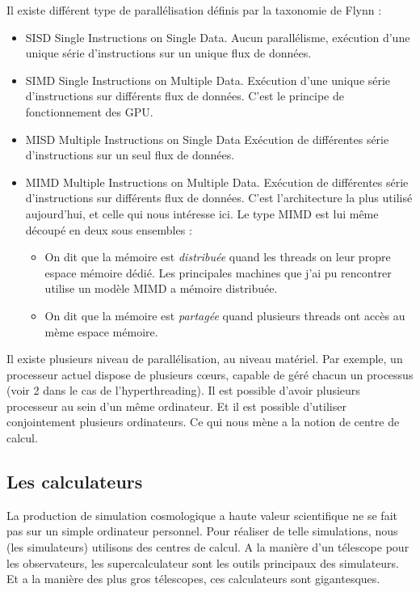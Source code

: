 Il existe différent type de parallélisation définis par la taxonomie de Flynn \citep{Flynn:1972:COE:1952456.1952459}: 

\begin{itemize}
\item SISD Single Instructions on Single Data.
Aucun parallélisme, exécution d'une unique série d'instructions sur un unique flux de données.

\item SIMD Single Instructions on Multiple Data.
Exécution d'une unique série d'instructions sur différents flux de données.
C'est le principe de fonctionnement des GPU.

\item MISD Multiple Instructions on Single Data 
Exécution de différentes série d'instructions sur un seul flux de données.

\item MIMD Multiple Instructions on Multiple Data.
Exécution de différentes série d'instructions sur différents flux de données.
C'est l’architecture la plus utilisé aujourd'hui, et celle qui nous intéresse ici.
Le type MIMD est lui même découpé en deux sous ensembles : 

\begin{itemize}
\item On dit que la mémoire est \textit{distribuée} quand les threads on leur propre espace mémoire dédié.
Les principales machines que j'ai pu rencontrer utilise un modèle MIMD a mémoire distribuée.

\item On dit que la mémoire est \textit{partagée} quand plusieurs threads ont accès au mème espace mémoire.
\end{itemize}
\end{itemize}

Il existe plusieurs niveau de parallélisation, au niveau matériel.
Par exemple, un processeur actuel dispose de plusieurs cœurs, capable de géré chacun un processus (voir 2 dans le cas de l'hyperthreading).
Il est possible d'avoir plusieurs processeur au sein d'un même ordinateur.
Et il est possible d'utiliser conjointement plusieurs ordinateurs.
Ce qui nous mène a la notion de centre de calcul.

\subsection{Les calculateurs}

La production de simulation cosmologique a haute valeur scientifique ne se fait pas sur un simple ordinateur personnel.
Pour réaliser de telle simulations, nous (les simulateurs) utilisons des centres de calcul.
A la manière d'un télescope pour les observateurs, les supercalculateur sont les outils principaux des simulateurs.
Et a la manière des plus gros télescopes, ces calculateurs sont gigantesques.

